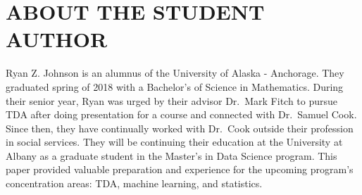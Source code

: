 \documentclass[10pt, letterpaper]{article}
\begin{document}
\section{ABOUT THE STUDENT AUTHOR}\label{about-the-student-author}

Ryan Z. Johnson is an alumnus of the University of Alaska - Anchorage.
They graduated spring of 2018 with a Bachelor's of Science in
Mathematics. During their senior year, Ryan was urged by their advisor
Dr.~Mark Fitch to pursue TDA after doing presentation for a course and
connected with Dr.~Samuel Cook. Since then, they have continually worked
with Dr.~Cook outside their profession in social services. They will be
continuing their education at the University at Albany as a graduate
student in the Master's in Data Science program. This paper provided
valuable preparation and experience for the upcoming program's
concentration areas: TDA, machine learning, and statistics.
\end{document}
